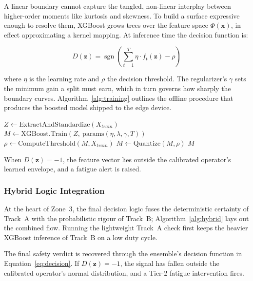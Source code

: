 A linear boundary cannot capture the tangled, non-linear interplay between
higher-order moments like kurtosis and skewness. To build a surface expressive
enough to resolve them, XGBoost grows trees over the feature space
$\Phi(\mathbf{x})$, in effect approximating a kernel mapping. At inference time
the decision function is:

\begin{equation}
D(\mathbf{z}) = \operatorname{sgn}\!\left( \sum_{t=1}^{T} \eta \cdot f_t(\mathbf{z}) - \rho \right)
\label{eq:decision}
\end{equation}

where $\eta$ is the learning rate and $\rho$ the decision threshold. The
regularizer's $\gamma$ sets the minimum gain a split must earn, which in turn
governs how sharply the boundary curves. Algorithm~\ref{alg:training} outlines
the offline procedure that produces the boosted model shipped to the edge device.

\begin{algorithm}[h]
\caption{Offline Training Procedure}
\label{alg:training}
$Z \gets \mathrm{ExtractAndStandardize}(X_{train})$\;
$M \gets \mathrm{XGBoost.Train}(Z,\ \mathrm{params}(\eta, \lambda, \gamma, T))$\;
$\rho \gets \mathrm{ComputeThreshold}(M, X_{train})$\;
$M \gets \mathrm{Quantize}(M, \rho)$\;
\Return $M$\;
\end{algorithm}

When $D(\mathbf{z}) = -1$, the feature vector lies outside the calibrated
operator's learned envelope, and a fatigue alert is raised.

\subsubsection{Hybrid Logic Integration}

At the heart of Zone~3, the final decision logic fuses the deterministic
certainty of Track~A with the probabilistic rigour of Track~B;
Algorithm~\ref{alg:hybrid} lays out the combined flow. Running the lightweight
Track~A check first keeps the heavier XGBoost inference of Track~B on a low duty
cycle.

The final safety verdict is recovered through the ensemble's decision function
in Equation~\eqref{eq:decision}. If $D(\mathbf{z}) = -1$, the signal has fallen
outside the calibrated operator's normal distribution, and a Tier-2 fatigue
intervention fires.

